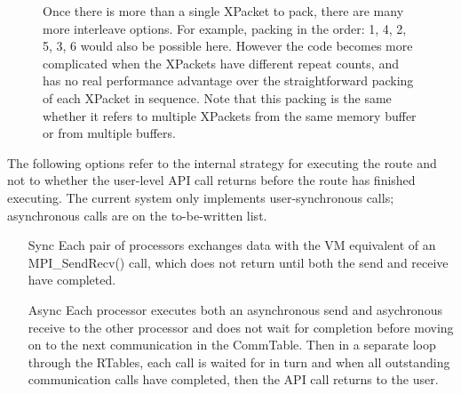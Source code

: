 \begin{enumerate}
\begin{center}
\begin{figure}
\caption{Once there is more than a single XPacket to pack, there
are many more interleave options.  For example, packing in the
order: 1, 4, 2, 5, 3, 6 would also be possible here.  However
the code becomes more complicated when the XPackets have different
repeat counts, and has no real performance advantage over the
straightforward packing of each XPacket in sequence.  Note that
this packing is the same whether it refers to multiple XPackets
from the same memory buffer or from multiple buffers.}
\label{fig:routepackall}
\end{figure}
\end{center}

The following options refer to the internal strategy for 
executing the route and not to whether the user-level API call
returns before the route has finished executing.  The current
system only implements user-synchronous calls; asynchronous calls
are on the to-be-written list.

\begin{enumerate}

\item[Sync] Each pair of processors exchanges data with the VM
equivalent of an MPI\_SendRecv() call, which does not return until
both the send and receive have completed.

\item[Async] Each processor executes both an asynchronous send
and asychronous receive to the other processor and does not wait
for completion before moving on to the next communication in the
CommTable.  Then in a separate loop through the RTables, each
call is waited for in turn and when all outstanding communication
calls have completed, then the API call returns to the user.


\end{enumerate}
\end{enumerate}
